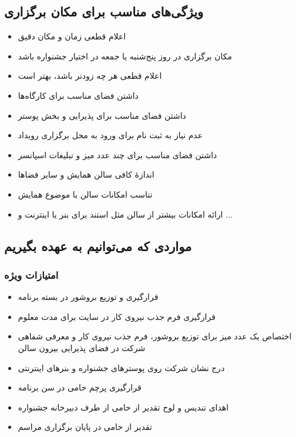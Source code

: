 \documentclass{article}
\begin{document}
\subsection{ویژگی‌های مناسب برای مکان برگزاری}


\begin{flushright}

\begin{itemize}
\item  اعلام قطعی زمان و مکان دقیق
\item مکان برگزاری در روز پنج‌شنبه یا جمعه در اختیار جشنواره باشد
\item اعلام قطعی هر چه زودتر باشد، بهتر است
\item داشتن فضای مناسب برای کارگاه‌ها
\item داشتن فضای مناسب برای پذیرایی و بخش پوستر
\item عدم نیاز به ثبت نام برای ورود به محل برگزاری رویداد
\item داشتن فضای مناسب برای چند عدد میز و تبلیغات اسپانسر
\item اندازهٔ کافی سالن همایش و سایر فضاها
\item تناسب امکانات سالن با موضوع همایش
\item ارائه امکانات بیشتر از سالن مثل استند برای بنر یا اینترنت و ... 
\end{itemize}

\end{flushright}


\subsection{مواردی که می‌توانیم به عهده بگیریم}

\subsubsection{امتیازات ویژه}

\begin{flushright}
\begin{itemize}
\item قرارگیری و توزیع بروشور در بسته برنامه
\item قرارگیری فرم جذب نیروی کار در سایت برای مدت معلوم
\item اختصاص یک عدد میز برای توزیع بروشور، فرم جذب نیروی کار و معرفی شفاهی شرکت در فضای پذیرایی بیرون سالن
\item درج نشان شرکت روی پوسترهای جشنواره و بنرهای اینترنتی
\item قرارگیری پرچم حامی در سن برنامه
\item اهدای تندیس و لوح تقدیر از حامی از طرف دبیرخانه جشنواره
\item تقدیر از حامی در پایان برگزاری مراسم
\end{itemize}
\end{flushright}
\end{document}
